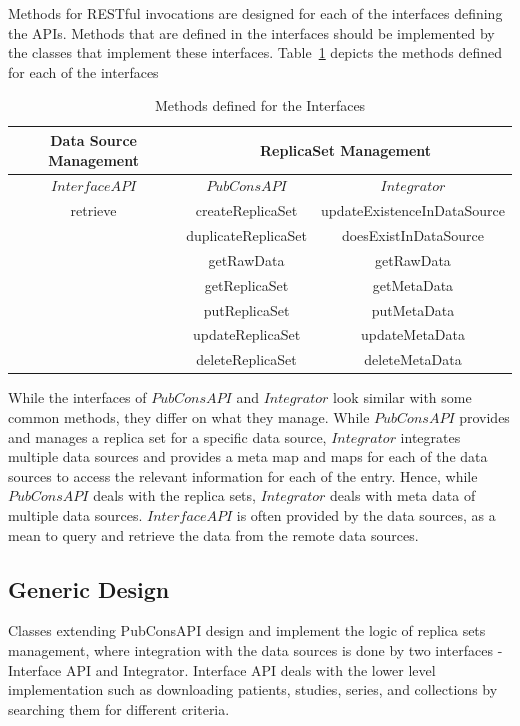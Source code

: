 \documentclass[conference]{IEEEtran}
\begin{document}
Methods for RESTful invocations are designed for each of the interfaces defining the APIs. Methods that are defined in the interfaces should be implemented by the classes that implement these interfaces. Table~\ref{table:interfaces} depicts the methods defined for each of the interfaces

\begin{table}[!ht]
\centering
\caption{Methods defined for the Interfaces}
\label{table:interfaces}
\begin{tabular}{|c||c| |c|}

\toprule
\textbf{Data Source Management} & \multicolumn{2}{c}{\textbf{ReplicaSet Management}} \\
\midrule

\textbf{$InterfaceAPI$} & \textbf{$PubConsAPI$}&\textbf{$Integrator$} \\
\hline
retrieve & createReplicaSet&updateExistenceInDataSource \\
  & duplicateReplicaSet&doesExistInDataSource\\
  & getRawData&getRawData\\
 & getReplicaSet&getMetaData \\
 & putReplicaSet&putMetaData \\
 & updateReplicaSet&updateMetaData \\
 & deleteReplicaSet&deleteMetaData \\
\bottomrule
\end{tabular}
\end{table}

While the interfaces of $PubConsAPI$ and $Integrator$ look similar with some common methods, they differ on what they manage. While $PubConsAPI$ provides and manages a replica set for a specific data source, $Integrator$ integrates multiple data sources and provides a meta map and maps for each of the data sources to access the relevant information for each of the entry. Hence, while $PubConsAPI$ deals with the replica sets, $Integrator$ deals with meta data of multiple data sources. $InterfaceAPI$ is often provided by the data sources, as a mean to query and retrieve the data from the remote data sources.


\subsection{Generic Design}
Classes extending PubConsAPI design and implement the logic of replica sets management, where integration with the data sources is done by two interfaces - Interface API and Integrator. Interface API deals with the lower level implementation such as downloading patients, studies, series, and collections by searching them for different criteria. 
\end{document}
